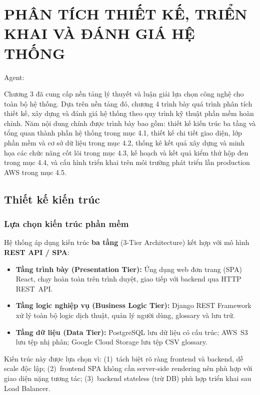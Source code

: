 \chapter{PHÂN TÍCH THIẾT KẾ, TRIỂN KHAI VÀ ĐÁNH GIÁ HỆ THỐNG}

Agent:

Chương 3 đã cung cấp nền tảng lý thuyết và luận giải lựa chọn công nghệ cho toàn bộ hệ thống. Dựa trên nền tảng đó, chương 4 trình bày quá trình phân tích thiết kế, xây dựng và đánh giá hệ thống theo quy trình kỹ thuật phần mềm hoàn chỉnh. Năm nội dung chính được trình bày bao gồm: thiết kế kiến trúc ba tầng và tổng quan thành phần hệ thống trong mục 4.1, thiết kế chi tiết giao diện, lớp phần mềm và cơ sở dữ liệu trong mục 4.2, thống kê kết quả xây dựng và minh họa các chức năng cốt lõi trong mục 4.3, kế hoạch và kết quả kiểm thử hộp đen trong mục 4.4, và cấu hình triển khai trên môi trường phát triển lẫn production AWS trong mục 4.5.

\section{Thiết kế kiến trúc}

\subsection{Lựa chọn kiến trúc phần mềm}

Hệ thống áp dụng kiến trúc \textbf{ba tầng} (3-Tier Architecture) kết hợp với mô hình
\textbf{REST API / SPA}:

\begin{itemize}
  \item \textbf{Tầng trình bày (Presentation Tier):} Ứng dụng web đơn trang (SPA) React, chạy
    hoàn toàn trên trình duyệt, giao tiếp với backend qua HTTP REST~API.
  \item \textbf{Tầng logic nghiệp vụ (Business Logic Tier):} Django REST Framework xử lý toàn
    bộ logic dịch thuật, quản lý người dùng, glossary và lưu trữ.
  \item \textbf{Tầng dữ liệu (Data Tier):} PostgreSQL lưu dữ liệu có cấu trúc; AWS~S3 lưu
    tệp nhị phân; Google Cloud Storage lưu tệp CSV glossary.
\end{itemize}

Kiến trúc này được lựa chọn vì: (1)~tách biệt rõ ràng frontend và backend, dễ scale độc lập;
(2)~frontend SPA không cần server-side rendering nên phù hợp với giao diện nặng tương tác;
(3)~backend stateless (trừ DB) phù hợp triển khai sau Load Balancer.

